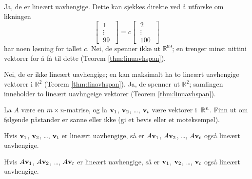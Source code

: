 \begin{losning}

\begin{punkt}
Ja, de er lineært uavhengige. Dette kan sjekkes direkte ved å utforske om likningen 
\[ 
\begin{bmatrix} 
\;1\; \\ 
\;\vdots\; \\ 
\;99\; 
\end{bmatrix}
=c
\begin{bmatrix} 
\;2\; \\ 
\;\vdots\; \\ 
\;100\; 
\end{bmatrix}
\] har noen løsning for tallet $c$. Nei, de spenner ikke ut $\mathbb{R}^{99}$; en trenger minst nittini vektorer for å få til dette (Teorem \ref{thm:linuavhspan}).
\end{punkt}

\begin{punkt}
Nei, de er ikke lineært uavhengige; en kan maksimalt ha to lineært uavhengige vektorer i $\mathbb{R}^2$ (Teorem \ref{thm:linavhspan}). Ja, de spenner ut $\mathbb{R}^2$; samlingen inneholder to lineært uavhngeige vektorer (Teorem \ref{thm:linuavhspan}).
\end{punkt}

\end{losning}


\begin{oppgave}
La $A$ være en $m \times n$-matrise, og la $\mathbf{v}_1$, $\mathbf{v}_2$,
\ldots, $\mathbf{v}_t$ være vektorer i~$\mathbb{R}^n$.  Finn ut om følgende
påstander er sanne eller ikke (gi et bevis eller et moteksempel).
\begin{punkt}
Hvis $\mathbf{v}_1$, $\mathbf{v}_2$, \ldots, $\mathbf{v}_t$ er lineært uavhengige, så
er $A \mathbf{v}_1$, $A \mathbf{v}_2$, \ldots, $A \mathbf{v}_t$ også lineært
uavhengige.
\end{punkt}
\begin{punkt}
Hvis $A \mathbf{v}_1$, $A \mathbf{v}_2$, \ldots, $A \mathbf{v}_t$ er lineært
uavhengige, så er $\mathbf{v}_1$, $\mathbf{v}_2$, \ldots, $\mathbf{v}_t$ også lineært
uavhengige.
\end{punkt}
\end{oppgave}

